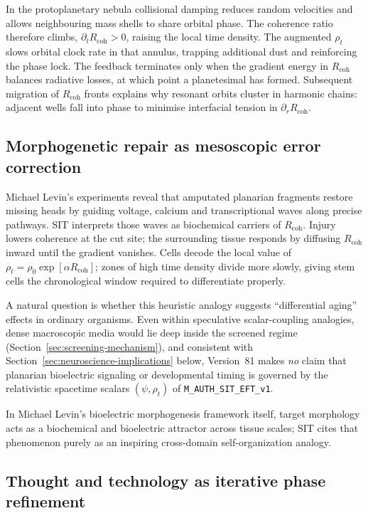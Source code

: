 In the protoplanetary nebula collisional damping reduces random velocities and allows neighbouring mass shells to share orbital phase.  The coherence ratio therefore climbs, $\partial_{t}R_{\text{coh}}>0$, raising the local time density.  The augmented $\rho_{t}$ slows orbital clock rate in that annulus, trapping additional dust and reinforcing the phase lock.  The feedback terminates only when the gradient energy in $R_{\text{coh}}$ balances radiative losses, at which point a planetesimal has formed.  Subsequent migration of $R_{\text{coh}}$ fronts explains why resonant orbits cluster in harmonic chains: adjacent wells fall into phase to minimise interfacial tension in $\partial_{r}R_{\text{coh}}$.

\subsection*{Morphogenetic repair as mesoscopic error correction}

Michael Levin's experiments reveal that amputated planarian fragments restore missing heads by guiding voltage, calcium and transcriptional waves along precise pathways.  SIT interprets those waves as biochemical carriers of $R_{\text{coh}}$.  Injury lowers coherence at the cut site; the surrounding tissue responds by diffusing $R_{\text{coh}}$ inward until the gradient vanishes.  Cells decode the local value of $\rho_{t}=\rho_{0}\exp[\alpha R_{\text{coh}}]$; zones of high time density divide more slowly, giving stem cells the chronological window required to differentiate properly.  

A natural question is whether this heuristic analogy suggests ``differential aging'' effects in ordinary organisms. Even within speculative scalar-coupling analogies, dense macroscopic media would lie deep inside the screened regime (Section~\ref{sec:screening-mechanism}), and consistent with Section~\ref{sec:neuroscience-implications} below, Version~81 makes \emph{no} claim that planarian bioelectric signaling or developmental timing is governed by the relativistic spacetime scalars $(\psi, \rho_t)$ of \texttt{M\_AUTH\_SIT\_EFT\_v1}.

In Michael Levin's bioelectric morphogenesis framework itself, target morphology acts as a biochemical and bioelectric attractor across tissue scales; SIT cites that phenomenon purely as an inspiring cross-domain self-organization analogy.

\subsection*{Thought and technology as iterative phase refinement}

